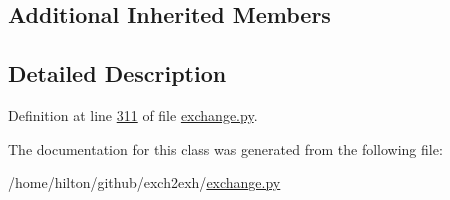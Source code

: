 \subsection*{Additional Inherited Members}


\subsection{Detailed Description}


Definition at line \hyperlink{exchange_8py_source_l00311}{311} of file \hyperlink{exchange_8py_source}{exchange.\+py}.



The documentation for this class was generated from the following file\+:\begin{DoxyCompactItemize}
\item 
/home/hilton/github/exch2exh/\hyperlink{exchange_8py}{exchange.\+py}\end{DoxyCompactItemize}
